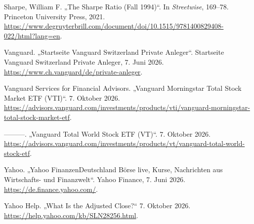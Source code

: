 \documentclass[
  ngerman,
  a4paper,
  DIV=11,
  oneside]{scrreprt}
\newlength{\cslhangindent}
\newenvironment{CSLReferences}[2] %
 {\begin{list}{}{%
  \setlength{\itemindent}{0pt}
  \setlength{\leftmargin}{0pt}
  \setlength{\parsep}{0pt}
  \ifodd #1
   \setlength{\leftmargin}{\cslhangindent}
   \setlength{\itemindent}{-1\cslhangindent}
  \fi
  \setlength{\itemsep}{#2\baselineskip}}}
 {\end{list}}
\begin{document}
\begin{CSLReferences}{1}{1}
Sharpe, William F. {„The {Sharpe Ratio} ({Fall} 1994)``}. In
\emph{Streetwise}, 169--78. Princeton University Press, 2021.
\url{https://www.degruyterbrill.com/document/doi/10.1515/9781400829408-022/html?lang=en}.

Vanguard. {„Startseite \textbar{} Vanguard Switzerland Private
Anleger``}. Startseite \textbar{} Vanguard Switzerland Private Anleger,
7. Juni 2026. \url{https://www.ch.vanguard/de/private-anleger}.

Vanguard Services for Financial Advisors. {„Vanguard {Morningstar Total
Stock Market ETF} ({VTI})``}. 7. Oktober 2026.
\url{https://advisors.vanguard.com/investments/products/vti/vanguard-morningstar-total-stock-market-etf}.

---------. {„Vanguard {Total World Stock ETF} ({VT})``}. 7. Oktober
2026.
\url{https://advisors.vanguard.com/investments/products/vt/vanguard-total-world-stock-etf}.

Yahoo. {„Yahoo FinanzenDeutschland \textbar{} Börse live, Kurse,
Nachrichten aus Wirtschafts- und Finanzwelt``}. Yahoo Finance, 7. Juni
2026. \url{https://de.finance.yahoo.com/}.

Yahoo Help. {„What Is the Adjusted Close?``} 7. Oktober 2026.
\url{https://help.yahoo.com/kb/SLN28256.html}.

\end{CSLReferences}
\end{document}
